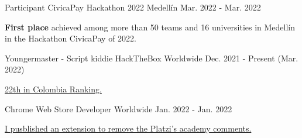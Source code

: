
\begin{cventries}

  \cventry
    {Participant} %
    {CivicaPay Hackathon 2022} %
    {Medellín} %
    {Mar. 2022 - Mar. 2022} %
    {
      \begin{cvitems} %
        \item {\textbf{First place} achieved among more than 50 teams and 16 universities in 
        Medellín in the Hackathon CivicaPay of 2022.}
      \end{cvitems}
    }

  \cventry
    {Youngermaster - Script kiddie} %
    {HackTheBox} %
    {Worldwide} %
    {Dec. 2021 - Present (Mar. 2022)} %
    {
      \begin{cvitems} %
        \item {\href{https://app.hackthebox.com/rankings/country/CO}{22th in Colombia Ranking.}}
      \end{cvitems}
    }

  \cventry
    {Chrome Web Store} %
    {Developer} %
    {Worldwide} %
    {Jan. 2022 - Jan. 2022} %
    {
      \begin{cvitems} %
        \item {\href{https://chrome.google.com/webstore/detail/platzi-community-wrapper/dakgbbfpefoofghfbkopnbnpadeblbep}
        {I pusblished an extension to remove the Platzi's academy comments.}}
      \end{cvitems}
    }



\end{cventries}
